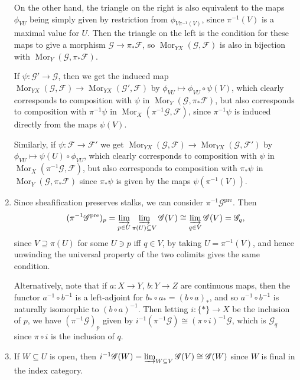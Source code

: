 \documentclass{report}
\newcommand{\pre}{{\mathrm{pre}}} %
\newcommand{\colimit}{\varinjlim} %
\newcommand{\scrF}{\mathscr{F}}
\newcommand{\scrG}{\mathscr{G}}
\DeclareMathOperator{\Mor}{Mor}
\begin{document}
\begin{enumerate}[label=\textbf{2.7.\Alph*.}]
	      On the other hand, the triangle on the right is also equivalent to the
	      maps $\phi_{VU}$ being simply given by restriction from
	      $\phi_{V\pi^{-1}(V)}$, since $\pi^{-1}(V)$ is a maximal value for $U$.
	      Then the triangle on the left is the condition for these maps to give a
	      morphism $\scrG\to\pi_*\scrF$, so $\Mor_{YX}(\scrG,\scrF)$ is also in bijection with
	      $\Mor_Y(\scrG,\pi_*\scrF)$.

	      If $\psi:\scrG'\to\scrG$, then we get the induced map
	      $\Mor_{YX}(\scrG,\scrF)\to\Mor_{YX}(\scrG',\scrF)$ by
	      $\phi_{VU}\mapsto\phi_{VU}\circ\psi(V)$, which clearly corresponds to
	      composition with $\psi$ in $\Mor_Y(\scrG,\pi_*\scrF)$, but also corresponds to
	      composition with $\pi^{-1}\psi$ in $\Mor_X(\pi^{-1}\scrG,\scrF)$, since
	      $\pi^{-1}\psi$ is induced directly from the maps $\psi(V)$.

	      Similarly, if $\psi:\scrF\to\scrF'$ we get
	      $\Mor_{YX}(\scrG,\scrF)\to\Mor_{YX}(\scrG,\scrF')$ by
	      $\phi_{VU}\mapsto\psi(U)\circ\phi_{VU}$, which clearly corresponds to
	      composition with $\psi$ in $\Mor_X(\pi^{-1}\scrG,\scrF)$, but also corresponds
	      to composition with $\pi_*\psi$ in $\Mor_Y(\scrG,\pi_*\scrF)$ since
	      $\pi_*\psi$ is given by the maps $\psi(\pi^{-1}(V))$.

	\item Since sheafification preserves stalks, we can consider
	      $\pi^{-1}\scrG^\pre$. Then
	      \begin{equation*}
		      (\pi^{-1}\scrG^\pre)_p
		      = \colimit_{p\in U}\colimit_{\pi(U)\subseteq V}\scrG(V)
		      \cong \colimit_{q\in V}\scrG(V)
		      = \scrG_q,
	      \end{equation*}
	      since $V\supseteq\pi(U)$ for some $U\ni p$ iff $q\in V$, by taking
	      $U=\pi^{-1}(V)$, and hence unwinding the universal property of the two
	      colimits gives the same condition.

	      Alternatively, note that if $a:X\to Y$, $b:Y\to Z$ are continuous maps,
	      then the functor $a^{-1}\circ b^{-1}$ is a left-adjoint for
	      $b_*\circ a_*=(b\circ a)_*$, and so $a^{-1}\circ b^{-1}$ is naturally
	      isomorphic to $(b\circ a)^{-1}$. Then letting $i:\{*\}\to X$ be the
	      inclusion of $p$, we have $(\pi^{-1}\scrG)_p$ given by
	      $i^{-1}(\pi^{-1}\scrG)\cong(\pi\circ i)^{-1}\scrG$, which is $\scrG_q$ since
	      $\pi\circ i$ is the inclusion of $q$.

	\item If $W\subseteq U$ is open, then
	      $i^{-1}\scrG(W)=\colimit_{W\subseteq V}\scrG(V)\cong\scrG(W)$ since $W$ is final
	      in the index category.


\end{enumerate}
\end{document}
